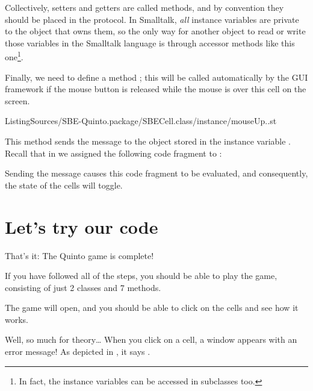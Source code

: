 \documentclass[a4paper,10pt,twoside]{book}
\begin{document}
Collectively, setters and getters are called  methods\cite{Klim96a}, and by convention they should be placed in the  protocol.
In Smalltalk, \emph{all} instance variables are private to the object that owns them, so the only way for another object to read or write those variables in the Smalltalk language is through accessor methods like this one\footnote{%
	In fact, the instance variables can be accessed in subclasses too.%
}.


Finally, we need to define a method ; this will be called automatically by the GUI framework if the mouse button is released while the mouse is over this cell on the screen.

%
{ListingSources/SBE-Quinto.package/SBECell.class/instance/mouseUp..st}


This method sends the message  to the object stored in the instance variable .
Recall that in  we assigned the following code fragment to :


\noindent
Sending the  message causes this code fragment to be evaluated, and consequently, the state of the cells will toggle.

\section{Let's try our code}

That's it:
The Quinto game is complete!

If you have followed all of the steps, you should be able to play the game, consisting of just 2 classes and 7 methods.


The game will open, and you should be able to click on the cells and see how it works.

Well, so much for theory\ldots{}
When you click on a cell, a  window appears with an error message!
As depicted in , it says .
\end{document}
